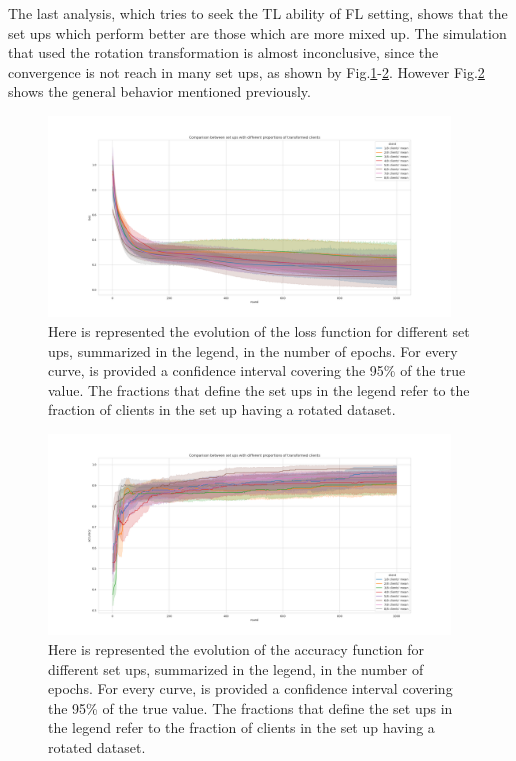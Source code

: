 \documentclass{article} %
\begin{document}
The last analysis, which tries to seek the TL ability of FL setting, shows that the 
set ups which perform better are those which are more mixed up.
The simulation that used the rotation transformation is almost inconclusive, since the 
convergence is not reach in many set ups, as shown by Fig.\ref{fig8}-\ref{fig9}.
However Fig.\ref{fig9} shows the general behavior mentioned previously.
\begin{figure}[!hb]
    \centering
        \includegraphics[width=0.95\textwidth, keepaspectratio]{images/loss_red_TL2.png}
    \caption{Here is represented the evolution of the loss function for different set ups, 
    summarized in the legend, in the number of epochs. For every curve, is provided a confidence 
    interval covering the 95\% of the true value. The fractions that define the set ups in the 
    legend refer to the fraction of clients in the set up having a rotated dataset.}
    \label{fig8}
\end{figure}
\begin{figure}[!ht]
    \centering
        \includegraphics[width=0.95\textwidth, keepaspectratio]{images/accuracy_red_TL2.png}
    \caption{Here is represented the evolution of the accuracy function for different set ups, 
    summarized in the legend, in the number of epochs. For every curve, is provided a confidence 
    interval covering the 95\% of the true value. The fractions that define the set ups in the 
    legend refer to the fraction of clients in the set up having a rotated dataset.}
    \label{fig9}
\end{figure}
\end{document}
